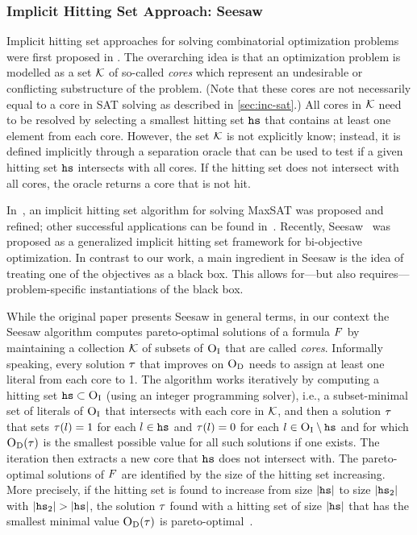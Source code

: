 \subsubsection{Implicit Hitting Set Approach: Seesaw\label{sec:seesaw}}

Implicit hitting set approaches for solving combinatorial optimization problems were first proposed in \textcite{DBLP:journals/ior/Moreno-CentenoK13}.
The overarching idea is that an optimization problem is modelled as a set $\mathcal{K}$ of so-called \emph{cores} which represent an undesirable or conflicting substructure of the problem.
(Note that these cores are not necessarily equal to a core in SAT solving as described in \cref{sec:inc-sat}.)
All cores in $\mathcal{K}$ need to be resolved by selecting a smallest hitting set $\texttt{hs}$ that contains at least one element from each core.
However, the set $\mathcal{K}$ is not explicitly know;
instead, it is defined implicitly through a separation oracle that can be used to test if a given hitting set $\texttt{hs}$ intersects with all cores.
If the hitting set does not intersect with all cores, the oracle returns a core that is not hit.

In~\textcite{DBLP:conf/cp/DaviesB13,DBLP:conf/sat/DaviesB13,DBLP:conf/cp/DaviesB11,DBLP:conf/sat/BergBP20}, an implicit hitting set algorithm for solving MaxSAT was proposed and refined;
other successful applications can be found in~\textcite{DBLP:conf/cp/IgnatievPLM15,DBLP:conf/kr/SaikkoWJ16,DBLP:conf/cade/FazekasBB18,DBLP:conf/kr/SaikkoDAJ18}.
Recently, Seesaw~\autocite{DBLP:conf/cp/JanotaMSM21} was proposed as a generalized implicit hitting set framework for bi-objective optimization.
In contrast to our work, a main ingredient in Seesaw is the idea of treating one of the objectives as a black box.
This allows for---but also requires---problem-specific instantiations of the black box.

While the original paper presents Seesaw in general terms, in our context the Seesaw algorithm computes pareto-optimal solutions of a formula $F$ by maintaining a collection $\mathcal{K}$ of subsets of $\textsc{O}_{\text{I}}$ that are called \emph{cores}.
Informally speaking, every solution $\tau$ that improves on $\textsc{O}_{\text{D}}$ needs to assign at least one literal from each core to 1.
The algorithm works iteratively by computing a hitting set $\texttt{hs} \subset \textsc{O}_{\text{I}}$ (using an integer programming solver), i.e., a subset-minimal set of literals of $\textsc{O}_{\text{I}}$ that intersects with each core in $\mathcal{K}$, and then a solution $\tau$ that sets $\tau(l) = 1$ for each $l \in \texttt{hs}$ and $\tau(l) = 0$ for each $l \in \textsc{O}_{\text{I}} \setminus \texttt{hs}$ and for which $\textsc{O}_{\text{D}}(\tau)$ is the smallest possible value for all such solutions if one exists.
The iteration then extracts a new core that $\texttt{hs}$ does not intersect with.
The pareto-optimal solutions of $F$ are identified by the size of the hitting set increasing.
More precisely, if the hitting set is found to increase from size $|\texttt{hs}|$ to size $|\texttt{hs}_2|$ with $|\hs_2|>|\hs|$, the solution $\tau$ found with a hitting set of size $|\texttt{hs}|$ that has the smallest minimal value $\textsc{O}_{\text{D}}(\tau)$ is pareto-optimal~\autocite{DBLP:conf/cp/JanotaMSM21}.

